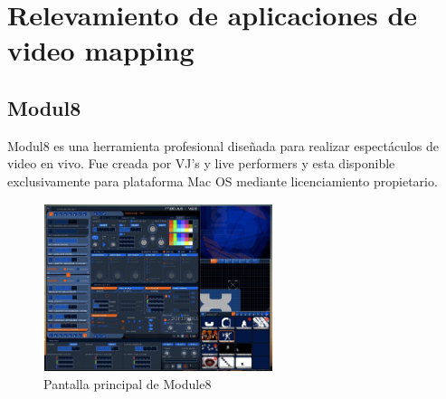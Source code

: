 ﻿\chapter{Relevamiento de aplicaciones de video mapping}
\section{Modul8}
Modul8\cite{Module8} es una herramienta profesional diseñada para realizar espectáculos de video en vivo. Fue creada por VJ's y live performers y esta disponible exclusivamente para plataforma Mac OS mediante licenciamiento propietario.

\begin{figure}[H]
  \centering
    \includegraphics[width=0.6\textwidth]{./Cap3_aplicaciones/apps-modul8.png}
  \caption{Pantalla principal de Module8}
  \label{fig:Apps-Module8}
\end{figure}

